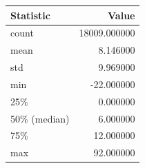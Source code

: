\begin{tabular}{lr}
\toprule
Statistic & Value \\
\midrule
count & 18009.000000 \\
mean & 8.146000 \\
std & 9.969000 \\
min & -22.000000 \\
25\% & 0.000000 \\
50\% (median) & 6.000000 \\
75\% & 12.000000 \\
max & 92.000000 \\
\bottomrule
\end{tabular}
